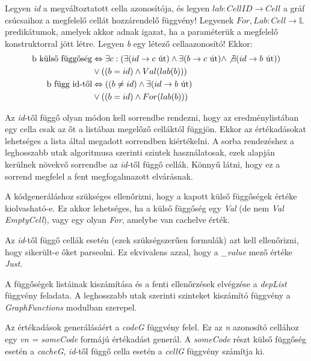 Legyen \textit{id} a megváltoztatott cella azonosítója, és legyen $lab : CellID \rightarrow Cell$ a gráf csúcsaihoz a megfelelő cellát hozzárendelő függvény! Legyenek $For,Lab : Cell \rightarrow \mathbb{L}$ predikátumok, amelyek akkor adnak igazat, ha a paraméterük a megfelelő konstruktorral jött létre. Legyen \textit{b} egy létező cellaazonosító! Ekkor:
\begin{align*}
	\text{b külső függőség} &\Leftrightarrow \exists c: (\exists (id \rightarrow c \text{ út}) \wedge \exists (b \rightarrow c \text{ út}) \wedge \not\exists  (id \rightarrow b \text{ út})) \\
	& \vee((b=id) \wedge Val(lab(b))) \\
	\text{b függ id-től} &\Leftrightarrow ((b \not= id) \wedge \exists (id \rightarrow b \text{ út}) \\
	&\vee ((b = id) \wedge For(lab(b)))
\end{align*}

Az \textit{id}-től függő olyan módon kell sorrendbe rendezni, hogy az eredménylistában egy cella csak az őt a listában megelőző celláktól függjön. Ekkor az értékadásokat lehetséges a lista által megadott sorrendben kiértékelni. A sorba rendezéshez a leghosszabb utak algoritmusa szerinti szintek használatosak, ezek alapján kerülnek növekvő sorrendbe az \textit{id}-től függő cellák. Könnyű látni, hogy ez a sorrend megfelel a fent megfogalmazott elvárásnak.  

A kódgeneráláshoz szükséges ellenőrizni, hogy a kapott külső függőségek értéke kiolvasható-e. Ez akkor lehetséges, ha a külső függőség egy \textit{Val} (de nem \textit{Val EmptyCell}), vagy egy olyan \textit{For}, amelybe van cachelve érték.

Az \textit{id}-től függő cellák esetén (ezek szükségszerűen formulák) azt kell ellenőrizni, hogy sikerült-e őket parseolni. Ez ekvivalens azzal, hogy a \textit{\_value} mező értéke \textit{Just}.

A függőségek listáinak kiszámítása és a fenti ellenőrzések elvégzése a \textit{depList} függvény feladata. A leghosszabb utak szerinti szinteket kiszámító függvény a \textit{GraphFunctions} modulban szerepel. 

Az értékadások generálásáért a \textit{codeG} függvény felel. Ez az \textit{n} azonosító cellához egy \textit{vn = someCode} formájú értékadást generál. A \textit{someCode} részt külső függőség esetén a \textit{cacheG}, \textit{id}-től függő cella esetén a \textit{cellG} függvény számítja ki.

